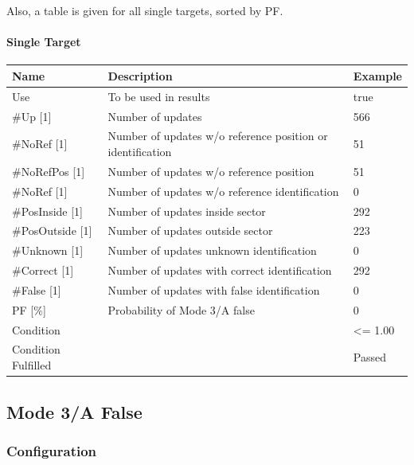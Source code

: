 Also, a table is given for all single targets, sorted by PF.

\paragraph{Single Target}

\begin{center}
 \begin{table}[H]
  \begin{tabularx}{\textwidth}{ | l | X |  l | }
    \hline
    \textbf{Name} & \textbf{Description} & \textbf{Example} \\ \hline
    Use & To be used in results & true \\ \hline
    \#Up [1] & Number of updates & 566 \\ \hline
    \#NoRef [1] & Number of updates w/o reference position or identification & 51 \\ \hline
    \#NoRefPos [1] & Number of updates w/o reference position  & 51 \\ \hline
    \#NoRef [1] & Number of updates w/o reference identification & 0 \\ \hline
    \#PosInside [1] & Number of updates inside sector & 292 \\ \hline
    \#PosOutside [1] & Number of updates outside sector & 223 \\ \hline
    \#Unknown [1] & Number of updates unknown identification & 0 \\ \hline
    \#Correct [1] & Number of updates with correct identification & 292 \\ \hline
    \#False [1] & Number of updates with false identification & 0 \\ \hline
    PF [\%] & Probability of Mode 3/A false & 0 \\ \hline
    Condition &  & <= 1.00 \\ \hline
    Condition Fulfilled &  & Passed \\ \hline
\end{tabularx}
\end{table}
\end{center}

\subsection{Mode 3/A False}
\label{sec:eval_req_m3a_false} 

\subsubsection{Configuration}

